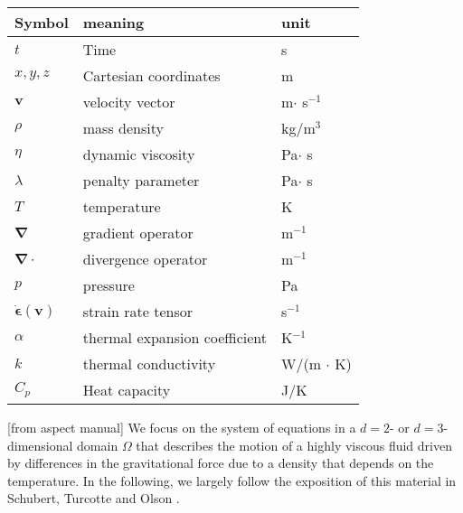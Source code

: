 
\begin{center}
\begin{tabular}{lll}
\hline
Symbol & meaning & unit \\
\hline
\hline
$t$ & Time & s \\
$x,y,z$ & Cartesian coordinates & m \\
${\bm v}$ & velocity vector & m$\cdot$ s$^{-1}$\\
$\rho$ & mass density & kg/m$^3$ \\
$\eta$ & dynamic viscosity &  Pa$\cdot$ s \\
$\lambda$ & penalty parameter & Pa$\cdot$ s \\
$T$ & temperature & K \\
${\bm \nabla}$ & gradient operator & m$^{-1}$ \\
${\bm \nabla}\cdot$ & divergence operator & m$^{-1}$ \\
$p$ & pressure & Pa\\
$\dot{\bm \epsilon}({\bm v})$ & strain rate tensor & s$^{-1}$ \\
$\alpha$ & thermal expansion coefficient & K$^{-1}$ \\
$k$ & thermal conductivity & W/(m $\cdot$ K) \\
$C_p$ & Heat capacity & J/K \\
\hline
\end{tabular}
\end{center}

[from aspect manual]
We focus on the system of equations in a $d=2$- or $d=3$-dimensional
domain $\Omega$ that describes the motion of a highly viscous fluid driven
by differences in the gravitational force due to a density that depends on
the temperature. In the following, we largely follow the exposition of this
material in Schubert, Turcotte and Olson \cite{scto01}.

